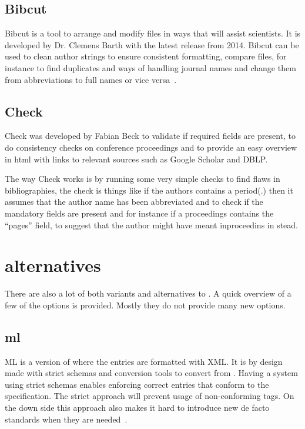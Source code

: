 \subsection{Bibcut}
Bibcut is a tool to arrange and modify {\bibtex} files in ways that
will assist scientists.  It is developed by Dr. Clemens Barth with the
latest release from 2014.  Bibcut can be used to clean author strings
to ensure consistent formatting, compare {\bibtex} files, for instance
to find duplicates and ways of handling journal names and change them
from abbreviations to full names or vice versa~\cite{bibcut_site}.

\subsection{{\bibtex} Check}
{\bibtex} Check was developed by Fabian Beck to validate if required
fields are present, to do consistency checks on conference proceedings
and to provide an easy overview in html with links to relevant sources
such as Google Scholar and DBLP.

The way {\bibtex} Check works is by running some very simple checks to
find flaws in bibliographies, the check is things like if the authors
contains a period(.) then it assumes that the author name has been
abbreviated and to check if the mandatory fields are present and for
instance if a proceedings contains the ``pages'' field, to suggest
that the author might have meant inproceedins in stead.


\section{{\bibtex} alternatives}
\label{sec:bibtex_alternatives}
There are also a lot of both variants and alternatives to {\bibtex}.
A quick overview of a few of the options is provided.  Mostly they do
not provide many new options.

\subsection{{\bibtex}ml} {\bibtex}ML is a version of {\bibtex} where
the entries are formatted with XML.  It is by design made with strict
schemas and conversion tools to convert from {\bibtex}.  Having a
system using strict schemas enables enforcing correct entries that
conform to the specification.  The strict approach will prevent usage
of non-conforming tags.  On the down side this approach also makes it
hard to introduce new de facto standards when they are
needed~\cite{gunhen2007_bibtexml}.

